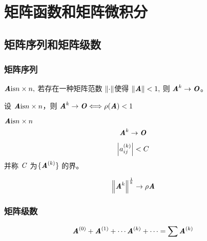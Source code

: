 \chapter{矩阵函数和矩阵微积分}
\label{cha:矩阵函数和矩阵微积分}


\section{矩阵序列和矩阵级数}
\label{sec:矩阵序列和矩阵级数}

\subsection{矩阵序列}
\label{sub:矩阵序列}

\begin{lemma}
    $\MA \text{is} n \times n,$ 若存在一种矩阵范数 $\norm{\cdot}$使得 $\norm{\MA} < 1,$ 则 $\MA^k \to \MO$。
\end{lemma}

\begin{theorem}
    设 $\MA \text{is} n \times n$，则 $\MA^k \to \MO \Longleftrightarrow \rho(\MA) < 1$
\end{theorem}

\begin{definition}[收敛矩阵]
    $\MA \text{is} n \times n$ \\
    \[
        \MA^k \to \MO
    \]
\end{definition}

\begin{definition}[界]
    \[
        \abs{a_{ij}^{(k)}} < C
    \]
    并称 $\SC$ 为$\{ \MA^{(k)} \}$ 的界。
\end{definition}

\begin{inference}
    \[
        \norm{\MA^k}^{\frac 1k} \to \rho{\MA}
    \]
\end{inference}



\subsection{矩阵级数}
\label{sub:矩阵级数}

\begin{definition}[矩阵级数]
    \[
        \MA^{(0)} + \MA^{(1)} + \cdots \MA^{(k)} + \cdots = \sum \MA^{(k)}
    \]
\end{definition}

